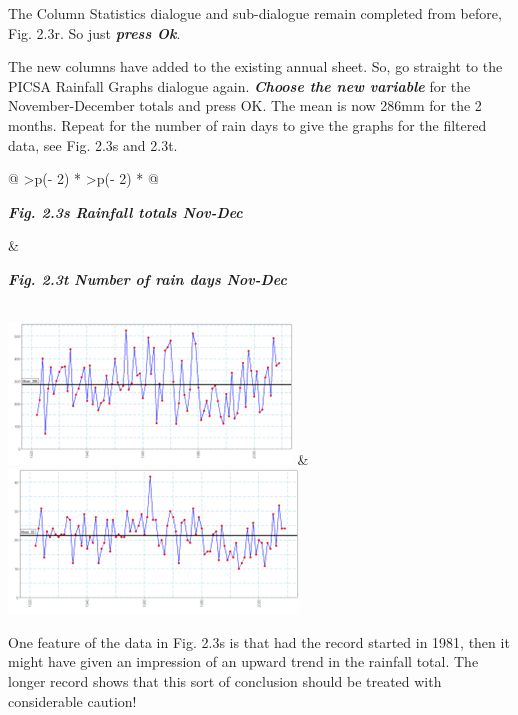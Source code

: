\documentclass[
  letterpaper,
  DIV=11,
  numbers=noendperiod]{scrreprt}
\begin{document}
The Column Statistics dialogue and sub-dialogue remain completed from
before, Fig. 2.3r. So just \textbf{\emph{press Ok}}.

The new columns have added to the existing annual sheet. So, go straight
to the PICSA Rainfall Graphs dialogue again. \textbf{\emph{Choose the
new variable}} for the November-December totals and press OK. The mean
is now 286mm for the 2 months. Repeat for the number of rain days to
give the graphs for the filtered data, see Fig. 2.3s and 2.3t.

\begin{longtable}[]{@{}
  >{\centering\arraybackslash}p{(\columnwidth - 2\tabcolsep) * }
  >{\centering\arraybackslash}p{(\columnwidth - 2\tabcolsep) * }@{}}
\toprule\noalign{}
\begin{minipage}[b]{\linewidth}\centering
\textbf{\emph{Fig. 2.3s Rainfall totals Nov-Dec}}
\end{minipage} & \begin{minipage}[b]{\linewidth}\centering
\textbf{\emph{Fig. 2.3t Number of rain days Nov-Dec}}
\end{minipage} \\
\midrule\noalign{}
\endhead
\bottomrule\noalign{}
\endlastfoot
\includegraphics[width=2.967in,height=1.476in]{figures/Fig2.3s.png} &
\includegraphics[width=3.032in,height=1.509in]{figures/Fig2.3t.png} \\
\end{longtable}

One feature of the data in Fig. 2.3s is that had the record started in
1981, then it might have given an impression of an upward trend in the
rainfall total. The longer record shows that this sort of conclusion
should be treated with considerable caution!
\end{document}
